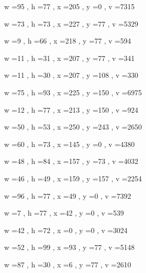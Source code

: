 \documentclass[11pt]{article}
\begin{document}
w =95 , h =77 , x =205 , y =0 , v =7315
\par
w =73 , h =73 , x =227 , y =77 , v =5329
\par
w =9 , h =66 , x =218 , y =77 , v =594
\par
w =11 , h =31 , x =207 , y =77 , v =341
\par
w =11 , h =30 , x =207 , y =108 , v =330
\par
w =75 , h =93 , x =225 , y =150 , v =6975
\par
w =12 , h =77 , x =213 , y =150 , v =924
\par
w =50 , h =53 , x =250 , y =243 , v =2650
\par
w =60 , h =73 , x =145 , y =0 , v =4380
\par
w =48 , h =84 , x =157 , y =73 , v =4032
\par
w =46 , h =49 , x =159 , y =157 , v =2254
\par
w =96 , h =77 , x =49 , y =0 , v =7392
\par
w =7 , h =77 , x =42 , y =0 , v =539
\par
w =42 , h =72 , x =0 , y =0 , v =3024
\par
w =52 , h =99 , x =93 , y =77 , v =5148
\par
w =87 , h =30 , x =6 , y =77 , v =2610
\par
\newpage
\end{document}
